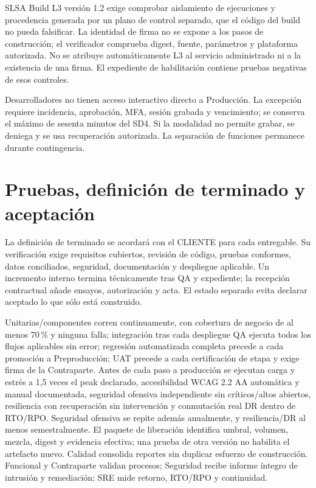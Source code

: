 SLSA Build L3 versión 1.2 exige comprobar aislamiento de ejecuciones y procedencia generada por un plano de control separado, que el código del build no pueda falsificar. La identidad de firma no se expone a los pasos de construcción; el verificador comprueba digest, fuente, parámetros y plataforma autorizada. No se atribuye automáticamente L3 al servicio administrado ni a la existencia de una firma. El expediente de habilitación contiene pruebas negativas de esos controles. \parencites{sd6-slsa,sd6-slsa-requisitos}

Desarrolladores no tienen acceso interactivo directo a Producción. La excepción requiere incidencia, aprobación, MFA, sesión grabada y vencimiento; se conserva el máximo de sesenta minutos del SD4. Si la modalidad no permite grabar, se deniega y se usa recuperación autorizada. La separación de funciones permanece durante contingencia. \parencite[RT-11.27, p.~24]{sd6-bt}

\section{Pruebas, definición de terminado y aceptación}
La definición de terminado se acordará con el CLIENTE para cada entregable. Su verificación exige requisitos cubiertos, revisión de código, pruebas conformes, datos conciliados, seguridad, documentación y despliegue aplicable. Un incremento interno termina técnicamente tras QA y expediente; la recepción contractual añade ensayos, autorización y acta. El estado separado evita declarar aceptado lo que sólo está construido. \parencite[RT-20.07/08, p.~35]{sd6-bt}

Unitarias/componentes corren continuamente, con cobertura de negocio de al menos 70\,\% y ninguna falla; integración tras cada despliegue QA ejecuta todos los flujos aplicables sin error; regresión automatizada completa precede a cada promoción a Preproducción; UAT precede a cada certificación de etapa y exige firma de la Contraparte. Antes de cada paso a producción se ejecutan carga y estrés a 1,5 veces el peak declarado, accesibilidad WCAG 2.2 AA automática y manual documentada, seguridad ofensiva independiente sin críticos/altos abiertos, resiliencia con recuperación sin intervención y conmutación real DR dentro de RTO/RPO. Seguridad ofensiva se repite además anualmente, y resiliencia/DR al menos semestralmente. El paquete de liberación identifica umbral, volumen, mezcla, digest y evidencia efectiva; una prueba de otra versión no habilita el artefacto nuevo. Calidad consolida reportes sin duplicar esfuerzo de construcción. Funcional y Contraparte validan procesos; Seguridad recibe informe íntegro de intrusión y remediación; SRE mide retorno, RTO/RPO y continuidad. \parencite[RT-11.20, p.~24; cap.~20, pp.~34--35]{sd6-bt}

